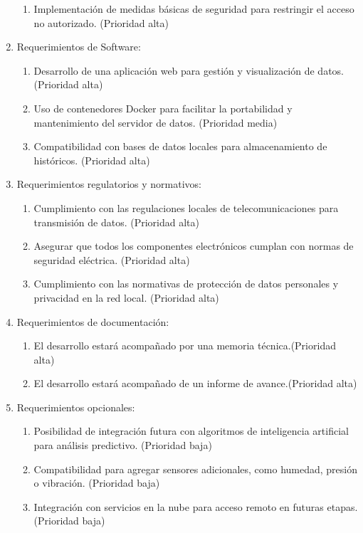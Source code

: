 \documentclass[
11pt, %
]{charter}
\begin{document}
\begin{enumerate}
\begin{enumerate}
		\item Implementación de medidas básicas de seguridad para restringir el acceso no autorizado. (Prioridad alta)
	\end{enumerate}
	\item Requerimientos de Software:
	\begin{enumerate}
		\item Desarrollo de una aplicación web para gestión y visualización de datos. (Prioridad alta)
		\item Uso de contenedores Docker para facilitar la portabilidad y mantenimiento del servidor de datos. (Prioridad media)
		\item Compatibilidad con bases de datos locales para almacenamiento de históricos. (Prioridad alta)
	\end{enumerate}
	\item Requerimientos regulatorios y normativos:
	\begin{enumerate}
		\item Cumplimiento con las regulaciones locales de telecomunicaciones para transmisión de datos. (Prioridad alta)
		\item Asegurar que todos los componentes electrónicos cumplan con normas de seguridad eléctrica. (Prioridad alta)
		\item Cumplimiento con las normativas de protección de datos personales y privacidad en la red local. (Prioridad alta)
	\end{enumerate}
	\item Requerimientos de documentación:
	\begin{enumerate}
		\item El desarrollo estará acompañado por una memoria técnica.(Prioridad alta)
		\item El desarrollo estará acompañado de un informe de avance.(Prioridad alta)
	\end{enumerate}
	\item Requerimientos opcionales:
	\begin{enumerate}
		\item Posibilidad de integración futura con algoritmos de inteligencia artificial para análisis predictivo. (Prioridad baja)
		\item Compatibilidad para agregar sensores adicionales, como humedad, presión o vibración. (Prioridad baja)
		\item Integración con servicios en la nube para acceso remoto en futuras etapas. (Prioridad baja)
	\end{enumerate}
\end{enumerate}
\end{document}
